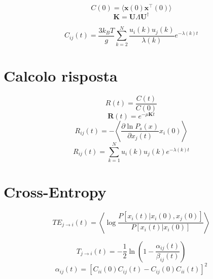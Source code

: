 \documentclass[Lau,binding=0.6cm,oneside,noexaminfo]{sapthesis}
\begin{document}
\begin{equation}
    C(0) = \langle \mathbf{x}(0) \mathbf{x}^\top(0) \rangle
    \end{equation}
\begin{equation}
    \mathbf{K} = \mathbf{U} \Lambda \mathbf{U}^\dagger
    \end{equation}
        
\begin{equation}
    C_{ij}(t) = \frac{3 k_B T}{g} \sum_{k=2}^{N} \frac{u_i(k) u_j(k)}{\lambda(k)} e^{-\lambda(k) t}
    \end{equation}
        
\section{Calcolo risposta}
\begin{equation}
    R(t) = \frac{C(t)}{C(0)}
    \end{equation}
\begin{equation}
    \mathbf{R}(t) = e^{-\mu \mathbf{K} t}
    \end{equation}
\begin{equation}
    R_{ij}(t) = - \left\langle \frac{\partial \ln P_s(x)}{\partial x_j(t)} x_i(0) \right\rangle
    \end{equation}
\begin{equation}
    R_{ij}(t) = \sum_{k=1}^{N} u_i(k) u_j(k) e^{-\lambda(k) t}
    \end{equation}


\section{Cross-Entropy}
\begin{equation}
    TE_{j \rightarrow i}(t) = \left\langle \log \frac{P[x_i(t) | x_i(0), x_j(0)]}{P[x_i(t) | x_i(0)]} \right\rangle
    \end{equation}
        
\begin{equation}
    T_{j \rightarrow i}(t) = - \frac{1}{2} \ln \left( 1 - \frac{\alpha_{ij}(t)}{\beta_{ij}(t)} \right)
    \end{equation}
\begin{equation}
    \alpha_{ij}(t) = [C_{ii}(0) C_{ij}(t) - C_{ij}(0) C_{ii}(t)]^2
    \end{equation}
        
\end{document}
